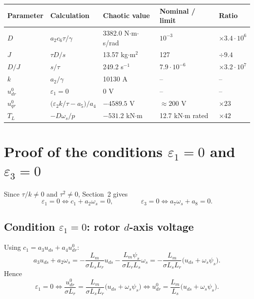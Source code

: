 \documentclass[11pt,a4paper]{article}
\begin{document}
\begin{center}
\small
\begin{tabular}{lllll}
\toprule
Parameter & Calculation & Chaotic value & Nominal / limit & Ratio\\
\midrule
$D$ & $a_2c_6\tau/\gamma$ & 3382.0 N$\cdot$m$\cdot$s/rad & $10^{-3}$ & $\times3.4\cdot10^{6}$\\
$J$ & $\tau D/s$ & 13.57 kg$\cdot$m$^2$ & 127 & $\div9.4$\\
$D/J$ & $s/\tau$ & 249.2 s$^{-1}$ & $7.9\cdot10^{-6}$ & $\times3.2\cdot10^{7}$\\
$k$ & $a_2/\gamma$ & 10130 A & -- & --\\
$u^0_{dr}$ & $\varepsilon_1=0$ & 0 V & -- & --\\
$u^0_{qr}$ & $\big(\varepsilon_2k/\tau-a_5\big)/a_4$ & $-4589.5$ V & $\approx200$ V & $\times23$\\
$T_L$ & $-D\omega_s/p$ & $-531.2$ kN$\cdot$m & 12.7 kN$\cdot$m rated & $\times42$\\
\bottomrule
\end{tabular}
\end{center}

\section{Proof of the conditions $\varepsilon_1=0$ and $\varepsilon_3=0$}

Since $\tau/k\neq0$ and $\tau^2\neq0$, Section~2 gives
\[
\varepsilon_1=0\iff c_1+a_2\omega_s=0,\qquad\qquad \varepsilon_3=0\iff a_7\omega_s+a_8=0 .
\]

\subsection{Condition $\varepsilon_1=0$: rotor $d$-axis voltage}
Using $c_1=a_3u_{ds}+a_4u^0_{dr}$:
\[
a_3u_{ds}+a_2\omega_s=-\frac{L_m}{\sigma L_sL_r}u_{ds}-\frac{L_m\psi_s}{\sigma L_rL_s}\omega_s=-\frac{L_m}{\sigma L_sL_r}\big(u_{ds}+\omega_s\psi_s\big).
\]
Hence
\[
\varepsilon_1=0\iff\frac{u^0_{dr}}{\sigma L_r}=\frac{L_m}{\sigma L_sL_r}\big(u_{ds}+\omega_s\psi_s\big)\iff
\boxed{u^0_{dr}=\frac{L_m}{L_s}\big(u_{ds}+\omega_s\psi_s\big)}.
\]
\end{document}
